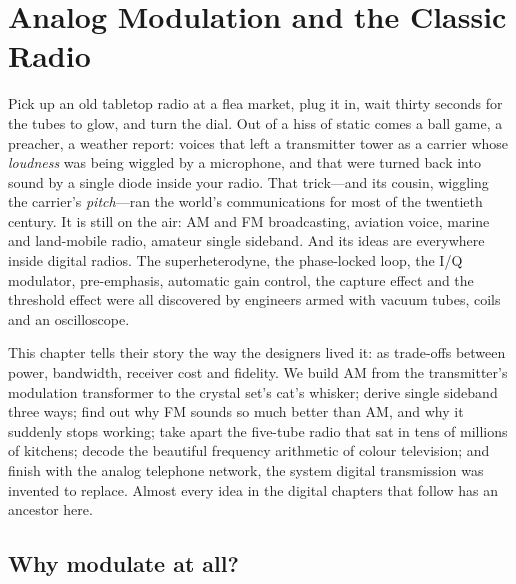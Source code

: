 \chapter{Analog Modulation and the Classic Radio}
\label{ch:analog}

\begin{chapterintro}
Pick up an old tabletop radio at a flea market, plug it in, wait thirty seconds for the tubes to
glow, and turn the dial. Out of a hiss of static comes a ball game, a preacher, a weather report:
voices that left a transmitter tower as a carrier whose \emph{loudness} was being wiggled by a
microphone, and that were turned back into sound by a single diode inside your radio. That trick---and
its cousin, wiggling the carrier's \emph{pitch}---ran the world's communications for most of the
twentieth century. It is still on the air: AM and FM broadcasting, aviation voice, marine and
land-mobile radio, amateur single sideband. And its ideas are everywhere inside digital radios. The
superheterodyne, the phase-locked loop, the I/Q modulator, pre-emphasis, automatic gain control, the
capture effect and the threshold effect were all discovered by engineers armed with vacuum tubes, coils
and an oscilloscope.

This chapter tells their story the way the designers lived it: as trade-offs between power, bandwidth,
receiver cost and fidelity. We build AM from the transmitter's modulation transformer to the crystal
set's cat's whisker; derive single sideband three ways; find out why FM sounds so much better than AM,
and why it suddenly stops working; take apart the five-tube radio that sat in tens of millions of
kitchens; decode the beautiful frequency arithmetic of colour television; and finish with the analog
telephone network, the system digital transmission was invented to replace. Almost every idea in the
digital chapters that follow has an ancestor here.
\end{chapterintro}


\section{Why modulate at all?}
\label{sec:ch04:why}


